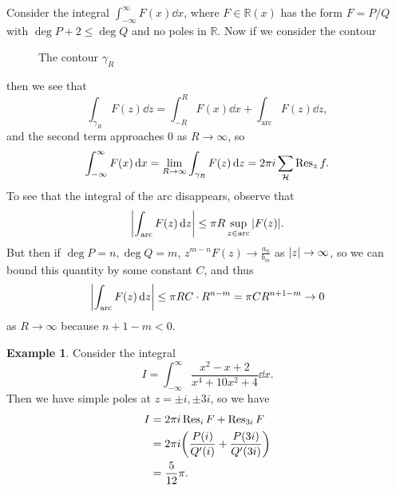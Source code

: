 \documentclass[leqno, openany]{memoir}
\theoremstyle{definition}
\newtheorem{exm}[thm]{Example}
\theoremstyle{remark}
\theoremstyle{plain}
\theoremstyle{definition}
\theoremstyle{remark}
\newcommand{\R}{\mathbb{R}}
\newcommand{\mc}[1]{\mathcal{#1}}
\begin{document}
Consider the integral $\int_{-\infty}^{\infty} F(x) \dd{x}$, where $F \in \R(x)$ has the form $F = P/Q$ with $\deg P + 2 \leq \deg Q$ and no poles in $\R$. Now if we consider the contour
\begin{figure}[H]
\begin{center}
\end{center}
\caption{The contour $\gamma_R$}%
\label{fig:contour-2}
\end{figure}
then we see that
\[ \int_{\gamma_R} F(z) \dd{z} = \int_{-R}^R F(x) \dd{x} + \int_{\text{arc}} F(z) \dd{z}, \]
and the second term approaches $0$ as $R \to \infty$, so 
\[ \int_{- \infty}^{\infty} F(x) \dd{x} = \lim_{R \to \infty} \int_{\gamma_R} F(z) \dd{z} = 2 \pi i \sum_{\mc{H}} \Res_z f. \]
To see that the integral of the arc disappears, observe that 
\[ \abs{\int_{\text{arc}} F(z) \dd{z}} \leq \pi R \sup_{z \in \text{arc}} \abs{F(z)}. \]
But then if $\deg P = n, \deg Q = m$, $z^{m-n} F(z) \to \frac{a_n}{b_m}$ as $\abs{z} \to \infty$, so we can bound this quantity by some constant $C$, and thus
\[ \abs{\int_{\text{arc}} F(z) \dd{z}} \leq \pi R C \cdot R^{n-m} = \pi C R^{n+1-m} \to 0 \]
as $R \to \infty$ because $n+1-m < 0$.

\begin{exm}
    Consider the integral
    \[ I = \int_{-\infty}^{\infty} \frac{x^2 - x + 2}{x^4 + 10x^2 + 4} \dd{x}. \]
    Then we have simple poles at $z = \pm i, \pm 3i$, so we have
    \begin{align*}
        I &= 2 \pi i \Res_i F + \Res_{3i} F \\
          &= 2 \pi i \qty(\frac{P(i)}{Q'(i)} + \frac{P(3i)}{Q'(3i)}) \\
          &= \frac{5}{12} \pi.
    \end{align*}
\end{exm}
\end{document}
